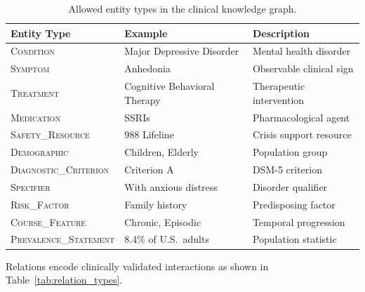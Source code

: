 \documentclass[12pt,a4paper]{article}
\begin{document}
\begin{table}[ht]
\centering
\caption{Allowed entity types in the clinical knowledge graph.}
\label{tab:entity_types}
\begin{tabular}{@{}lll@{}}
\toprule
\textbf{Entity Type} & \textbf{Example} & \textbf{Description} \\
\midrule
\textsc{Condition} & Major Depressive Disorder & Mental health disorder \\
\textsc{Symptom} & Anhedonia & Observable clinical sign \\
\textsc{Treatment} & Cognitive Behavioral Therapy & Therapeutic intervention \\
\textsc{Medication} & SSRIs & Pharmacological agent \\
\textsc{Safety\_Resource} & 988 Lifeline & Crisis support resource \\
\textsc{Demographic} & Children, Elderly & Population group \\
\textsc{Diagnostic\_Criterion} & Criterion A & DSM-5 criterion \\
\textsc{Specifier} & With anxious distress & Disorder qualifier \\
\textsc{Risk\_Factor} & Family history & Predisposing factor \\
\textsc{Course\_Feature} & Chronic, Episodic & Temporal progression \\
\textsc{Prevalence\_Statement} & 8.4\% of U.S.\ adults & Population statistic \\
\bottomrule
\end{tabular}
\end{table}

Relations encode clinically validated interactions as shown in Table~\ref{tab:relation_types}.
\end{document}
